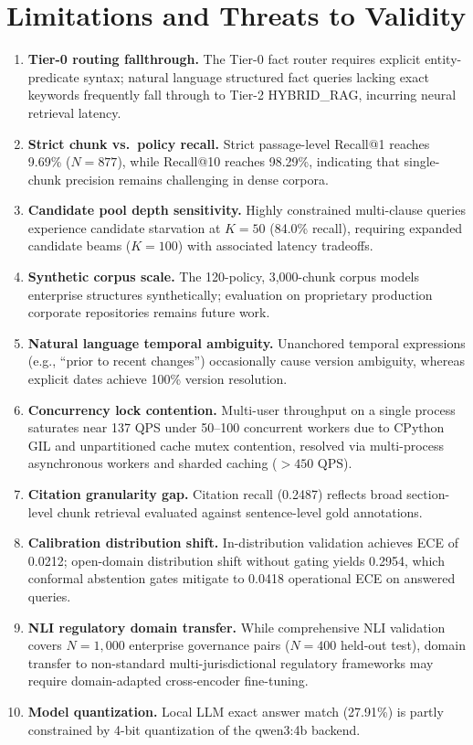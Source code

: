 \documentclass[journal]{IEEEtran}
\begin{document}
\section{Limitations and Threats to Validity}
\balance

\begin{enumerate}
  \setlength{\itemsep}{0pt}\setlength{\parsep}{0pt}\setlength{\topsep}{0.5pt}
  \item \textbf{Tier-0 routing fallthrough.} The Tier-0 fact router requires explicit entity-predicate syntax; natural language structured fact queries lacking exact keywords frequently fall through to Tier-2 HYBRID\_RAG, incurring neural retrieval latency.
  \item \textbf{Strict chunk vs.\ policy recall.} Strict passage-level Recall@1 reaches 9.69\% ($N=877$), while Recall@10 reaches 98.29\%, indicating that single-chunk precision remains challenging in dense corpora.
  \item \textbf{Candidate pool depth sensitivity.} Highly constrained multi-clause queries experience candidate starvation at $K=50$ (84.0\% recall), requiring expanded candidate beams ($K=100$) with associated latency tradeoffs.
  \item \textbf{Synthetic corpus scale.} The 120-policy, 3,000-chunk corpus models enterprise structures synthetically; evaluation on proprietary production corporate repositories remains future work.
  \item \textbf{Natural language temporal ambiguity.} Unanchored temporal expressions (e.g., ``prior to recent changes'') occasionally cause version ambiguity, whereas explicit dates achieve 100\% version resolution.
  \item \textbf{Concurrency lock contention.} Multi-user throughput on a single process saturates near 137 QPS under 50--100 concurrent workers due to CPython GIL and unpartitioned cache mutex contention, resolved via multi-process asynchronous workers and sharded caching ($>450\text{ QPS}$).
  \item \textbf{Citation granularity gap.} Citation recall (0.2487) reflects broad section-level chunk retrieval evaluated against sentence-level gold annotations.
  \item \textbf{Calibration distribution shift.} In-distribution validation achieves ECE of 0.0212; open-domain distribution shift without gating yields 0.2954, which conformal abstention gates mitigate to 0.0418 operational ECE on answered queries.
  \item \textbf{NLI regulatory domain transfer.} While comprehensive NLI validation covers $N=1,000$ enterprise governance pairs ($N=400$ held-out test), domain transfer to non-standard multi-jurisdictional regulatory frameworks may require domain-adapted cross-encoder fine-tuning.
  \item \textbf{Model quantization.} Local LLM exact answer match (27.91\%) is partly constrained by 4-bit quantization of the qwen3:4b backend.
\end{enumerate}
\end{document}
